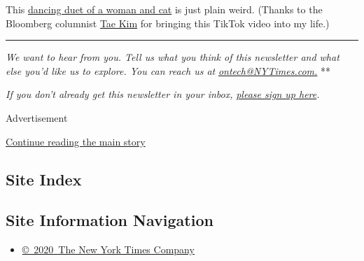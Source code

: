 This
\href{https://www.tiktok.com/@bizqueen/video/6852740756692569349}{dancing
duet of a woman and cat} is just plain weird. (Thanks to the Bloomberg
columnist \href{https://twitter.com/firstadopter}{Tae Kim} for bringing
this TikTok video into my life.)

\begin{center}\rule{0.5\linewidth}{\linethickness}\end{center}

\emph{We want to hear from you. Tell us what you think of this
newsletter and what else you'd like us to explore. You can reach us at}
\href{mailto:ontech@NYTimes.com?subject=On\%20Tech\%20Feedback}{\emph{ontech@NYTimes.com.}}
**

\emph{If you don't already get this newsletter in your inbox,}
\href{https://www.nytimes3xbfgragh.onion/newsletters/signup/OT}{\emph{please
sign up here}}\emph{.}

Advertisement

\protect\hyperlink{after-bottom}{Continue reading the main story}

\hypertarget{site-index}{%
\subsection{Site Index}\label{site-index}}

\hypertarget{site-information-navigation}{%
\subsection{Site Information
Navigation}\label{site-information-navigation}}

\begin{itemize}
\tightlist
\item
  \href{https://help.nytimes3xbfgragh.onion/hc/en-us/articles/115014792127-Copyright-notice}{©~2020~The
  New York Times Company}
\end{itemize}

